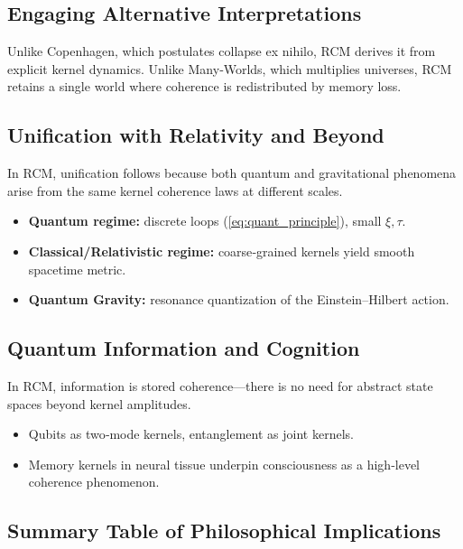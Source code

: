 \subsection{Engaging Alternative Interpretations}

Unlike Copenhagen, which postulates collapse ex nihilo, RCM derives it from explicit kernel dynamics.  
Unlike Many‐Worlds, which multiplies universes, RCM retains a single world where coherence is redistributed by memory loss.

\subsection{Unification with Relativity and Beyond}

In RCM, unification follows because both quantum and gravitational phenomena arise from the same kernel coherence laws at different scales.

\begin{itemize}
  \item \textbf{Quantum regime:} discrete loops (\autoref{eq:quant_principle}), small $\xi,\tau$.  
  \item \textbf{Classical/Relativistic regime:} coarse‐grained kernels yield smooth spacetime metric.  
  \item \textbf{Quantum Gravity:} resonance quantization of the Einstein–Hilbert action.
\end{itemize}

\subsection{Quantum Information and Cognition}

In RCM, information is stored coherence—there is no need for abstract state spaces beyond kernel amplitudes.

\begin{itemize}
  \item Qubits as two‐mode kernels, entanglement as joint kernels.  
  \item Memory kernels in neural tissue underpin consciousness as a high‐level coherence phenomenon.
\end{itemize}

\subsection{Summary Table of Philosophical Implications}

